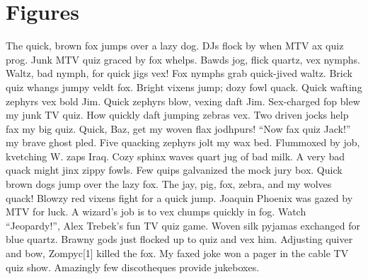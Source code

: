 \section{Figures}
The quick, brown fox jumps over a lazy dog. DJs flock by when MTV ax quiz prog. Junk MTV quiz graced by fox whelps. Bawds jog, flick quartz, vex nymphs. Waltz, bad nymph, for quick jigs vex! Fox nymphs grab quick-jived waltz. Brick quiz whangs jumpy veldt fox. Bright vixens jump; dozy fowl quack. Quick wafting zephyrs vex bold Jim. Quick zephyrs blow, vexing daft Jim. Sex-charged fop blew my junk TV quiz. How quickly daft jumping zebras vex. Two driven jocks help fax my big quiz. Quick, Baz, get my woven flax jodhpurs! ``Now fax quiz Jack!'' my brave ghost pled. Five quacking zephyrs jolt my wax bed. Flummoxed by job, kvetching W. zaps Iraq. Cozy sphinx waves quart jug of bad milk. A very bad quack might jinx zippy fowls. Few quips galvanized the mock jury box. Quick brown dogs jump over the lazy fox. The jay, pig, fox, zebra, and my wolves quack! Blowzy red vixens fight for a quick jump. Joaquin Phoenix was gazed by MTV for luck. A wizard’s job is to vex chumps quickly in fog. Watch ``Jeopardy!'', Alex Trebek's fun TV quiz game. Woven silk pyjamas exchanged for blue quartz. Brawny gods just flocked up to quiz and vex him. Adjusting quiver and bow, Zompyc[1] killed the fox. My faxed joke won a pager in the cable TV quiz show. Amazingly few discotheques provide jukeboxes.

